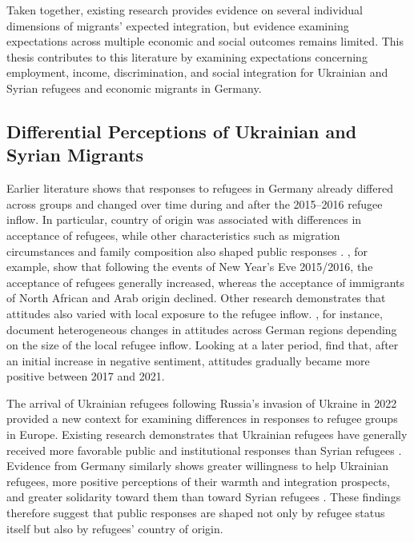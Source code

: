 Taken together, existing research provides evidence on several individual dimensions of migrants’ expected integration, 
but evidence examining expectations across multiple economic and social outcomes remains limited. This thesis 
contributes to this literature by examining expectations concerning employment, income, 
discrimination, and social integration for Ukrainian and Syrian refugees and economic migrants in Germany.

\subsection{Differential Perceptions of Ukrainian and Syrian Migrants}

Earlier literature shows that responses to refugees in Germany already differed across groups 
and changed over time during and after the 2015–2016 refugee inflow. In particular, country of origin was associated 
with differences in acceptance of refugees, while other characteristics such as migration 
circumstances and family composition also shaped public responses \citep{bansak2016economic,
czymara2016deutschland, czymara2017refugees, plener2017unaccompanied, liebe2018welcome}. \citet{czymara2017refugees}, 
for example, show that following the events of New Year’s Eve 2015/2016, the acceptance of refugees generally increased, 
whereas the acceptance of immigrants of North African and Arab origin declined. Other research demonstrates that 
attitudes also varied with local exposure to the refugee inflow. \citet{albarosa2023forced}, for instance, 
document heterogeneous changes in attitudes across German regions depending on the size of the local refugee inflow.
Looking at a later period, \citet{przechomski2026level} find that, after an initial increase in negative sentiment, 
attitudes gradually became more positive between 2017 and 2021.

The arrival of Ukrainian refugees following Russia's invasion of Ukraine in 2022 provided a new context for examining 
differences in responses to refugee groups in Europe. Existing research demonstrates that Ukrainian refugees have generally received 
more favorable public and institutional responses than Syrian refugees \citep{moise2024european, drewski2025states, das2025changing}. 
Evidence from Germany similarly shows greater willingness to help Ukrainian refugees, more positive perceptions of their 
warmth and integration prospects, and greater solidarity toward them than toward Syrian refugees \citep{echterhoff2023gefluchtete,
schmidt2024hierarchien, stefaniak2025double}. These findings therefore suggest that public responses
are shaped not only by refugee status itself but also by refugees’ country of origin.

